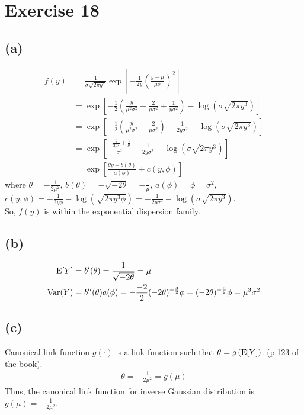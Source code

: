 \section*{Exercise 18}
\subsection*{(a)}

\begin{align*}
f(y) &= \frac{1}{\sigma\sqrt{2\pi y^{3}}}\exp\left[-\frac{1}{2y}\left(\frac{y-\mu}{\mu\sigma}\right)^{2}\right]\\
&= \exp\left[-\frac{1}{2}\left(\frac{y}{\mu^{2}\sigma^{2}} -\frac{2}{\mu\sigma^{2}} + \frac{1}{y\sigma^{2}}\right) -\log\left(\sigma\sqrt{2\pi y^{3}}\right)\right]\\
&= \exp\left[-\frac{1}{2}\left(\frac{y}{\mu^{2}\sigma^{2}} -\frac{2}{\mu\sigma^{2}}\right) -\frac{1}{2y\sigma^{2}} -\log\left(\sigma\sqrt{2\pi y^{3}}\right)\right]\\
&= \exp\left[\frac{-\frac{y}{2\mu^{2}} +\frac{1}{\mu}}{\sigma^{2}} -\frac{1}{2y\sigma^{2}} -\log\left(\sigma\sqrt{2\pi y^{3}}\right)\right]\\
&= \exp\left[\frac{\theta y - b(\theta)}{a(\phi)} + c(y,\phi)\right]
\end{align*}
where $\theta = -\frac{1}{2\mu^{2}}$, $b(\theta) = -\sqrt{-2\theta}  = -\frac{1}{\mu}$, $a(\phi) = \phi = \sigma^{2}$, $c(y,\phi) = -\frac{1}{2y\phi} -\log\left(\sqrt{2\pi y^{3}\phi}\right) = -\frac{1}{2y\sigma^{2}} -\log\left(\sigma\sqrt{2\pi y^{3}}\right)$.\\
So, $f(y)$ is within the exponential dispersion family.\\

\subsection*{(b)}
\begin{align*}
\mathrm{E}[Y] &= b'(\theta) = \frac{1}{\sqrt{-2\theta}} = \mu\\
\mathrm{Var}(Y) &= b''(\theta)a(\phi) = -\frac{-2}{2}(-2\theta)^{-\frac{3}{2}}\phi = (-2\theta)^{-\frac{3}{2}}\phi = \mu^{3}\sigma^{2}\\
\end{align*}


\subsection*{(c)}
Canonical link function $g(\cdot)$ is a link function such that $\theta = g\left(\mathrm{E}[Y] \right)$. (p.123 of the book).
\begin{align*}
\theta = -\frac{1}{2\mu^{2}} = g(\mu)
\end{align*}
Thus, the canonical link function for inverse Gaussian distribution is $g(\mu) = -\frac{1}{2\mu^{2}}$.

